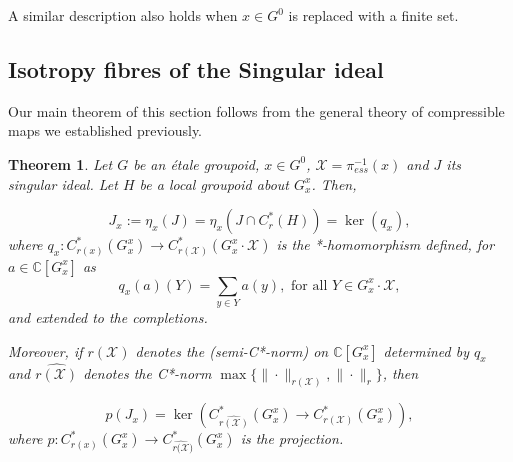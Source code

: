 \documentclass[a4paper, 12pt]{amsart}
\newtheorem{thm}{Theorem}[section]
\theoremstyle{definition}
\theoremstyle{remark}
\numberwithin{equation}{section}
\begin{document}
A similar description also holds when $x\in G^{0}$ is replaced with a finite set.

\subsection{Isotropy fibres of the Singular ideal}
\label{ss:isofibres}
 

Our main theorem of this section follows from the general theory of compressible maps we established previously.

\begin{thm}
\label{thm:isofibre}
    Let $G$ be an \'etale groupoid, $x\in G^{0}$, $\mathcal{X} = \pi^{-1}_{ess}(x)$ and $J$ its singular ideal. Let $H$ be a local groupoid about $G^{x}_{x}$. Then, 
    
    $$J_{x} := \eta_{x}(J) = \eta_{x}(J\cap C^{*}_{r}(H)) = \ker(q_{x}),$$ where $q_{x}:C^{*}_{r(x)}(G^{x}_{x})\to C^{*}_{r(\mathcal{X})}(G^{x}_{x}\cdot \mathcal{X})$ is the *-homomorphism defined, for $a\in \mathbb{C}[G_{x}^{x}]$ as $$q_{x}(a)(Y) = \sum_{y\in Y}a(y), \text{ for all }Y\in G^{x}_{x}\cdot\mathcal{X},$$ and extended to the completions. 
    
    Moreover, if $r(\mathcal{X})$ denotes the (semi-C*-norm) on $\mathbb{C}[G^{x}_{x}]$ determined by $q_{x}$ and $\widehat{r(\mathcal{X})}$ denotes the C*-norm $\max\{\|\cdot\|_{r(\mathcal{X})}, \|\cdot\|_{r}\}$, then 

    $$p(J_{x}) = \ker(C^{*}_{\widehat{r(\mathcal{X})}}(G^{x}_{x})\to C^{*}_{r(\mathcal{X})}(G^{x}_{x})),$$ where $p:C^{*}_{r(x)}(G^{x}_{x})\to C^{*}_{\widehat{r(\mathcal{X}})}(G^{x}_{x})$ is the projection.
\end{thm}
\end{document}
